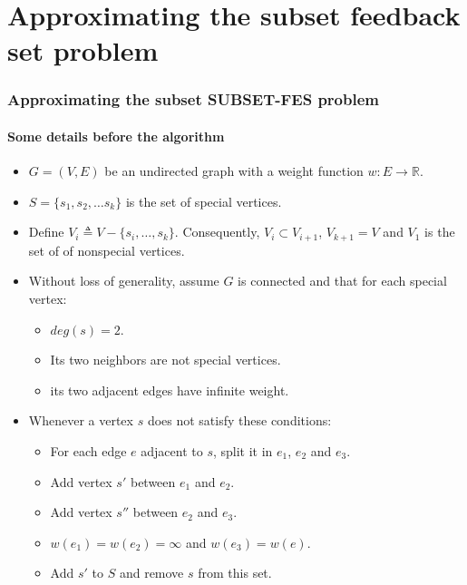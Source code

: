 \documentclass[10pt]{beamer}
\begin{document}
\section{Approximating the subset feedback set problem}
\begin{frame}
\frametitle{Approximating the subset SUBSET-FES problem}
\framesubtitle{Some details before the algorithm}
\begin{itemize}
    \item \(G = (V, E)\) be an undirected graph with a weight function \(w : E \rightarrow \mathbb{R}\).
    \item \(S = \{s_1, s_2, \ldots s_k\}\) is the set of special vertices.
    \item Define \(V_i \triangleq V - \{s_i, \ldots, s_k\} \). Consequently, \(V_i \subset V_{i+1}\), \(V_{k+1} = V \) and \(V_1\) is the set of of nonspecial vertices.
    \item Without loss of generality, assume \(G\) is connected and that for each special vertex:
    \begin{itemize}
        \item \(deg(s) = 2\).
        \item Its two neighbors are not special vertices.
        \item its two adjacent edges have infinite weight.
    \end{itemize}
    \item Whenever a vertex \(s\) does not satisfy these conditions:
    \begin{itemize}
        \item For each edge \(e\) adjacent to \(s\), split it in \(e_1\), \(e_2\) and \(e_3\).
        \item Add vertex \(s'\) between \(e_1\) and \(e_2\).
        \item Add vertex \(s''\) between \(e_2\) and \(e_3\).
        \item \(w(e_1) = w(e_2) = \infty\) and \(w(e_3) = w(e)\).
        \item Add \(s'\) to \(S\) and remove \(s\) from this set.
    \end{itemize}
\end{itemize}
\end{frame}
\end{document}
